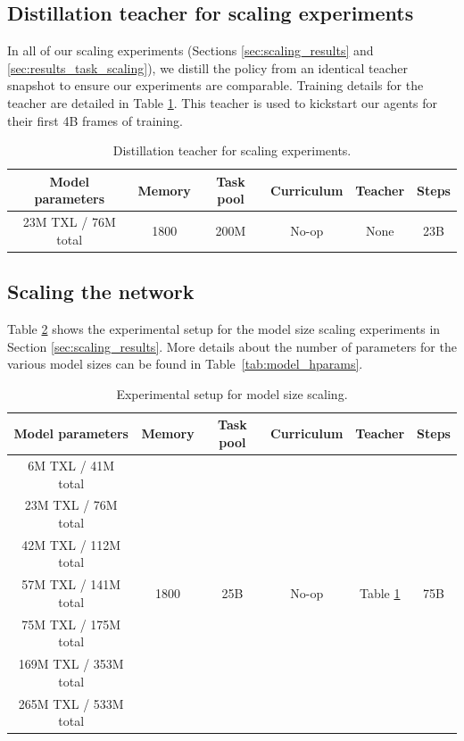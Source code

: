 \subsection{Distillation teacher for scaling experiments}
\label{app:scaling_distillation_teacher}
In all of our scaling experiments (Sections \ref{sec:scaling_results} and \ref{sec:results_task_scaling}), we distill the policy from an identical teacher snapshot to ensure our experiments are comparable. Training details for the teacher are detailed in Table \ref{tab:Teacher}. This teacher is used to kickstart our agents for their first 4B frames of training. 

\begin{table}[h!]
  \begin{center}
    \caption{Distillation teacher for scaling experiments.}
    \begin{tabular}{c|c|c|c|c|c}
    \label{tab:Teacher}
      Model parameters & Memory & Task pool & Curriculum & Teacher & Steps\\ %
      \hline
      23M TXL / 76M total & 1800 & 200M & No-op & None & 23B \\ %
    \end{tabular}
  \end{center}
\end{table}

\subsection{Scaling the network}
\label{app:network-scaling}
Table \ref{tab:model_scaling} shows the experimental setup for the model size scaling experiments in Section \ref{sec:scaling_results}. More details about the number of parameters for the various model sizes can be found in Table~\ref{tab:model_hparams}.

\begin{table}[t!]
  \begin{center}
    \caption{Experimental setup for model size scaling.}
    \begin{tabular}{c|c|c|c|c|c}
    \label{tab:model_scaling}
      Model parameters & Memory & Task pool & Curriculum  & Teacher & Steps \\ %
      \hline
      6M TXL / 41M total & \multirow{7}{*}{1800} & \multirow{7}{*}{25B} & \multirow{7}{*}{No-op} & \multirow{7}{*}{Table \ref{tab:Teacher}} & \multirow{7}{*}{75B}\\ %
      23M TXL / 76M total&&&&&\\ %
      42M TXL / 112M total&&&&&\\
      57M TXL / 141M total&&&&&\\
      75M TXL / 175M total&&&&&\\
      169M TXL / 353M total&&&&&\\
      265M TXL / 533M total&&&&&\\
    \end{tabular}
  \end{center}
\end{table}


